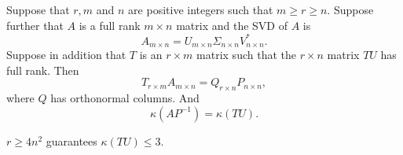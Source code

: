 
\begin{theorem}
	Suppose that $r,m$ and $n$ are positive integers such that $m \geq r \geq n$. Suppose further that $A$ is a full rank $m \times n$ matrix and the SVD of $A$ is
	$$
	A_{m \times n} = U_{m \times n} \Sigma_{n \times n} V^*_{n \times n}.
	$$
	Suppose in addition that $T$ is an $r \times m$ matrix such that the $r \times n$ matrix $TU$ has full rank.
	Then
	$$
	T_{r \times m} A_{m \times n} = Q_{r \times n} P_{n \times n},
	$$
	where $Q$ has orthonormal columns.
	And
	$$
	\kappa(AP^{-1}) = \kappa(TU).
	$$
\end{theorem}
\small{$r \geq 4n^2$ guarantees $\kappa(TU) \leq 3.$}
